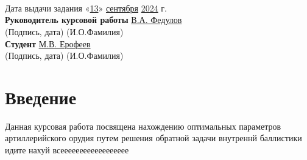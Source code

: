 \documentclass[14pt, a4paper]{extarticle} %
\newcommand{\und}[1]{\uline{#1}}
\begin{document}
\begin{titlepage}
\begin{flushleft}
        \underline{\hspace{15cm}} \\
        \underline{\hspace{15cm}} \\
        \underline{\hspace{15cm}} \\[1.5cm]
        Дата выдачи задания «\und{13}» \und{сентября} \und{2024} г. \\[2cm]
        \textbf{Руководитель курсовой работы} \hfill \underline{\hspace{5cm}} \hfill \und{В.А. Федулов} \\
        \hspace{8cm} (Подпись, дата) \hspace{2cm} (И.О.Фамилия) \\[1.5cm]
        \textbf{Студент} \hfill \underline{\hspace{5cm}} \hfill \und{М.В. Ерофеев} \\
        \hspace{8cm} (Подпись, дата) \hspace{2cm} (И.О.Фамилия)
    \end{flushleft}

\end{titlepage}
\tableofcontents

\newpage
\section*{Введение}
Данная курсовая работа посвящена нахождению оптимальных параметров артиллерийского орудия путем решения обратной задачи внутреннй баллистики идите нахуй всееееееееееееееееее
\end{document}
